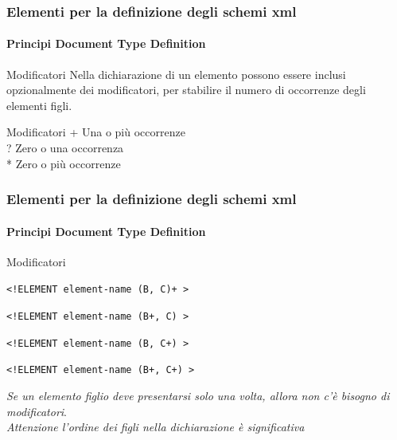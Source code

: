 \begin{frame}
    \frametitle{Elementi per la definizione degli schemi xml}
    \framesubtitle{Principi Document Type Definition}
    \addtocounter{nframe}{1}

    \begin{block}{Modificatori}
        Nella dichiarazione di un elemento possono essere inclusi opzionalmente dei modificatori, per stabilire il numero di occorrenze degli elementi figli.
    \end{block}

    \begin{block}{Modificatori}
     + Una o più occorrenze\\ 
     ? Zero o una occorrenza\\
     * Zero o più occorrenze
    \end{block}
\end{frame}

\begin{frame}
    \frametitle{Elementi per la definizione degli schemi xml}
    \framesubtitle{Principi Document Type Definition}
    \addtocounter{nframe}{1}

    \begin{block}{Modificatori}
        \begin{center} \texttt{<!ELEMENT element-name (B, C)+ >} \end{center}
        \begin{center} \texttt{<!ELEMENT element-name (B+, C) >} \end{center}
        \begin{center} \texttt{<!ELEMENT element-name (B, C+) >} \end{center}
        \begin{center} \texttt{<!ELEMENT element-name (B+, C+) >} \end{center}
    \end{block}

     \textit{Se un elemento figlio deve presentarsi solo una volta, allora non c'è bisogno di modificatori}.
     \\\textit{Attenzione l'ordine dei figli nella dichiarazione è significativa}
    
\end{frame}

